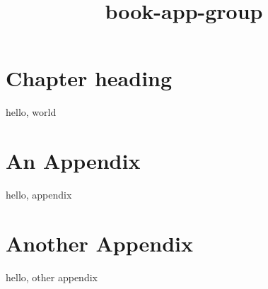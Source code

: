 \documentclass{gsm-l}
\title{book-app-group}
\begin{document}
\maketitle

\chapter{Chapter heading}

hello, world

\appendix

\chapter*{An Appendix}

hello, appendix

\chapter*{Another Appendix}

hello, other appendix
\end{document}
